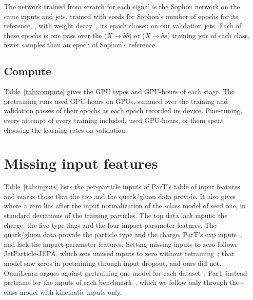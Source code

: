 The network trained from scratch for each signal is the Sophon network on the same inputs and jets,
trained with \MlstXbxScratchSeedsWord{} seeds for Sophon's number of epochs for its reference, \LitSophonScratchEpochs, with weight
decay~\cite[App.~B.3]{sophon}, its epoch chosen on our validation jets. Each of these epochs is one pass over
the \XbbNTrainPerClass{} ($X\to b\bar b$) or \XbsNTrainPerClass{} ($X\to bs$) training jets of each class,
fewer samples than an epoch of Sophon's reference.

\subsection{Compute}\label{sec:app-compute}

Table~\ref{tab:compute} gives the GPU types and GPU-hours of each stage. The pretraining runs used
\MlstComputeTotalGpuHours{} GPU-hours on \MlstComputeGpuTypes{} GPUs, summed over the training and validation
passes of their epochs as each epoch recorded its device. Fine-tuning, every attempt of every training
included, used \MlstFtGpuHours{} GPU-hours, \MlstFtGpuHoursSearch{} of them spent choosing the learning rates on
validation.





\section{Missing input features}\label{sec:app-inputs}

Table~\ref{tab:inputs} lists the \FillNFeatures{} per-particle inputs of ParT's table of input
features~\cite[Table~2]{part} and marks those that the top and the quark/gluon data provide. It also gives where
a zero lies after the input normalization of the \Kfull-class model of seed one, in standard deviations of the
training particles. The top data lack \FillTopNZero{} inputs: the charge, the five type flags and the four
impact-parameter features. The quark/gluon data provide the particle type and the charge, ParT's exp
inputs~\cite{part}, and lack the \FillQgNZero{} impact-parameter features. Setting missing inputs to zero follows
JetParticle-JEPA, which sets unused inputs to zero without retraining~\cite{jpjepa}; that model saw zeros in
pretraining through input dropout, and ours did not. OmniLearn argues against pretraining one model for each
dataset~\cite[Sec.~II.A]{omnilearn}; ParT instead pretrains for the inputs of each benchmark~\cite{part}, which
we follow only through the \Kfull-class model with kinematic inputs only.

